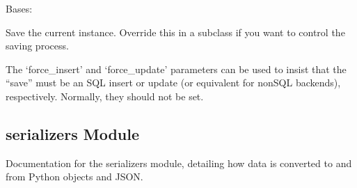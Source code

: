 \documentclass[letterpaper,10pt,english]{sphinxmanual}
\begin{document}
\begin{fulllineitems}
\begin{fulllineitems}
\end{fulllineitems}


\begin{fulllineitems}
\label{\detokenize{source/api:api.models.VoiceUpload.MultipleObjectsReturned}}
\pysigstartsignatures
{}
\pysigstopsignatures
\sphinxAtStartPar
Bases: 

\end{fulllineitems}


\begin{fulllineitems}
\label{\detokenize{source/api:api.models.VoiceUpload.save}}
\pysigstartsignatures
{}
\pysigstopsignatures
\sphinxAtStartPar
Save the current instance. Override this in a subclass if you want to
control the saving process.

\sphinxAtStartPar
The ‘force\_insert’ and ‘force\_update’ parameters can be used to insist
that the “save” must be an SQL insert or update (or equivalent for
non\sphinxhyphen{}SQL backends), respectively. Normally, they should not be set.

\end{fulllineitems}


\end{fulllineitems}



\subsection{serializers Module}
\label{\detokenize{source/api:serializers-module}}
\sphinxAtStartPar
Documentation for the serializers module, detailing how data is converted to and from Python objects and JSON.
\label{\detokenize{source/api:module-api.serializers}}
\end{document}
